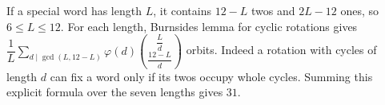 If a special word has length $L$, it contains $12-L$ twos and $2L-12$ ones, so $6\le L\le12$. For each length, Burnside\textquotesingle s lemma for cyclic rotations gives $\dfrac{1}{L}\sum_{d\mid\gcd(L,12-L)}\varphi(d)\binom{\dfrac{L}{d}}{\dfrac{12-L}{d}}$ orbits. Indeed a rotation with cycles of length $d$ can fix a word only if its twos occupy whole cycles. Summing this explicit formula over the seven lengths gives $\boxed{31}$.

